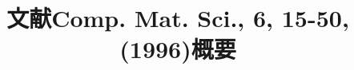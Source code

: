 \documentclass[14pt]{article}      %
\begin{document}
\graphicspath{{Figures/}}
%
\renewcommand{\abstractname}{\small{\CJKfamily{hei} 提\quad 要}} %
\renewcommand{\refname}{\centering\CJKfamily{hei} 参考文献}
\renewcommand{\figurename}{{\bf Fig}.}
\renewcommand{\tablename}{{\bf Tab}.}

\makeatletter
\long{}
\makeatother

\newcommand{\keywords}[1]{{\hspace{0\ccwd}\small{\CJKfamily{hei} 关键词:}{\hspace{2ex}{#1}}\bigskip}}



\title{文献Comp. Mat. Sci., 6, 15-50, (1996)概要}

\author{
\small
\small
}
\date{}					%
\maketitle
\end{document}
